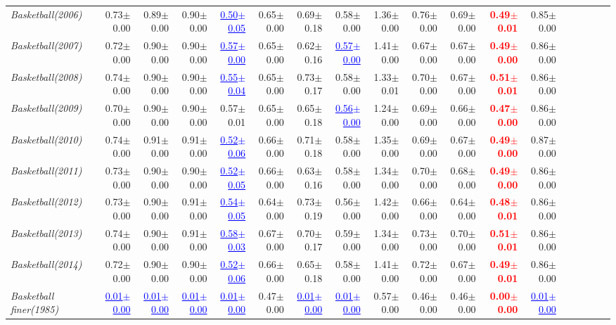 \documentclass[nohyperref]{article}
\theoremstyle{plain}
\theoremstyle{definition}
\theoremstyle{remark}
\newcommand{\red}[1]{\textcolor{red}{\textbf{#1}}}
\newcommand{\blue}[1]{\textcolor{blue}{\underline{#1}}}
\begin{document}
\begin{table*}[!ht]
{\begin{tabular}{lrrrrrrrrrrrrrrrrr}
			{\it Basketball(2006)} & 0.73$\pm$0.00 & 0.89$\pm$0.00 & 0.90$\pm$0.00 & \blue{0.50$\pm$0.05} & 0.65$\pm$0.00 & 0.69$\pm$0.18 & 0.58$\pm$0.00 & 1.36$\pm$0.00 & 0.76$\pm$0.00 & 0.69$\pm$0.00 & \red{0.49$\pm$0.01} & 0.85$\pm$0.00 \\
			{\it Basketball(2007)} & 0.72$\pm$0.00 & 0.90$\pm$0.00 & 0.90$\pm$0.00 & \blue{0.57$\pm$0.00} & 0.65$\pm$0.00 & 0.62$\pm$0.16 & \blue{0.57$\pm$0.00} & 1.41$\pm$0.00 & 0.67$\pm$0.00 & 0.67$\pm$0.00 & \red{0.49$\pm$0.00} & 0.86$\pm$0.00 \\
			{\it Basketball(2008)} & 0.74$\pm$0.00 & 0.90$\pm$0.00 & 0.90$\pm$0.00 & \blue{0.55$\pm$0.04} & 0.65$\pm$0.00 & 0.73$\pm$0.17 & 0.58$\pm$0.00 & 1.33$\pm$0.01 & 0.70$\pm$0.00 & 0.67$\pm$0.00 & \red{0.51$\pm$0.01} & 0.86$\pm$0.00 \\
			{\it Basketball(2009)} & 0.70$\pm$0.00 & 0.90$\pm$0.00 & 0.90$\pm$0.00 & 0.57$\pm$0.01 & 0.65$\pm$0.00 & 0.65$\pm$0.18 & \blue{0.56$\pm$0.00} & 1.24$\pm$0.00 & 0.69$\pm$0.00 & 0.66$\pm$0.00 & \red{0.47$\pm$0.00} & 0.86$\pm$0.00 \\
			{\it Basketball(2010)} & 0.74$\pm$0.00 & 0.91$\pm$0.00 & 0.91$\pm$0.00 & \blue{0.52$\pm$0.06} & 0.66$\pm$0.00 & 0.71$\pm$0.18 & 0.58$\pm$0.00 & 1.35$\pm$0.00 & 0.69$\pm$0.00 & 0.67$\pm$0.00 & \red{0.49$\pm$0.00} & 0.87$\pm$0.00 \\
			{\it Basketball(2011)} & 0.73$\pm$0.00 & 0.90$\pm$0.00 & 0.90$\pm$0.00 & \blue{0.52$\pm$0.05} & 0.66$\pm$0.00 & 0.63$\pm$0.16 & 0.58$\pm$0.00 & 1.34$\pm$0.00 & 0.70$\pm$0.00 & 0.68$\pm$0.00 & \red{0.49$\pm$0.00} & 0.86$\pm$0.00 \\
			{\it Basketball(2012)} & 0.73$\pm$0.00 & 0.90$\pm$0.00 & 0.91$\pm$0.00 & \blue{0.54$\pm$0.05} & 0.64$\pm$0.00 & 0.73$\pm$0.19 & 0.56$\pm$0.00 & 1.42$\pm$0.00 & 0.66$\pm$0.00 & 0.64$\pm$0.00 & \red{0.48$\pm$0.01} & 0.86$\pm$0.00 \\
			{\it Basketball(2013)} & 0.74$\pm$0.00 & 0.90$\pm$0.00 & 0.91$\pm$0.00 & \blue{0.58$\pm$0.03} & 0.67$\pm$0.00 & 0.70$\pm$0.17 & 0.59$\pm$0.00 & 1.34$\pm$0.00 & 0.73$\pm$0.00 & 0.70$\pm$0.00 & \red{0.51$\pm$0.01} & 0.86$\pm$0.00 \\
			{\it Basketball(2014)} & 0.72$\pm$0.00 & 0.90$\pm$0.00 & 0.90$\pm$0.00 & \blue{0.52$\pm$0.06} & 0.66$\pm$0.00 & 0.65$\pm$0.18 & 0.58$\pm$0.00 & 1.41$\pm$0.00 & 0.72$\pm$0.00 & 0.67$\pm$0.00 & \red{0.49$\pm$0.01} & 0.86$\pm$0.00 \\
			{\it Basketball finer(1985)} & \blue{0.01$\pm$0.00} & \blue{0.01$\pm$0.00} & \blue{0.01$\pm$0.00} & \blue{0.01$\pm$0.00} & 0.47$\pm$0.00 & \blue{0.01$\pm$0.00} & \blue{0.01$\pm$0.00} & 0.57$\pm$0.00 & 0.46$\pm$0.00 & 0.46$\pm$0.00 & \red{0.00$\pm$0.00} & \blue{0.01$\pm$0.00} \\

\end{tabular}}
\end{table*}
\end{document}

